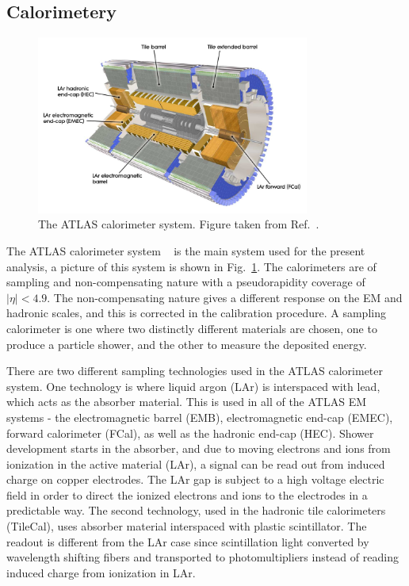 \subsection{Calorimetery}

\begin{figure}
	\centering
	\includegraphics[width=0.8\textwidth]{figures/calorimeters.pdf} %
	\caption{The ATLAS calorimeter system. Figure taken from Ref.~\cite{Aad:2008zzm}.}	
	\label{fig:calorimeters}
\end{figure}

The ATLAS calorimeter system ~\cite{Aad:2008zzm} is the main system used for the present analysis, a picture of this system is shown in Fig.~\ref{fig:calorimeters}. The calorimeters are of sampling and non-compensating nature with a pseudorapidity coverage of $|\eta|<4.9$. The non-compensating nature gives a different response on the EM and hadronic scales, and this is corrected in the calibration procedure. A sampling calorimeter is one where two distinctly different materials are chosen, one to produce a particle shower, and the other to measure the deposited energy. 

There are two different sampling technologies used in the ATLAS calorimeter system. One technology is where liquid argon (LAr) is interspaced with lead, which acts as the absorber material. This is used in all of the ATLAS EM systems - the electromagnetic barrel (EMB), electromagnetic end-cap (EMEC), forward calorimeter (FCal), as well as the hadronic end-cap (HEC). Shower development starts in the absorber, and due to moving electrons and ions from ionization in the active material (LAr), a signal can be read out from induced charge on copper electrodes. The LAr gap is subject to a high voltage electric field in order to direct the ionized electrons and ions to the electrodes in a predictable way. The second technology, used in the hadronic tile calorimeters (TileCal), uses absorber material interspaced with plastic scintillator. The readout is different from the LAr case since scintillation light converted by wavelength shifting fibers and transported to photomultipliers instead of reading induced charge from ionization in LAr.

